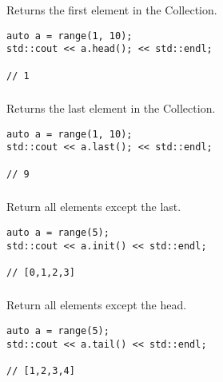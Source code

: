 Returns the first element in the Collection.

\begin{lstlisting}[title=example]
auto a = range(1, 10);
std::cout << a.head(); << std::endl;

// 1
\end{lstlisting}




\subsubsection{}

Returns the last element in the Collection.

\begin{lstlisting}[title=example]
auto a = range(1, 10);
std::cout << a.last(); << std::endl;

// 9
\end{lstlisting}




\subsubsection{}

Return all elements except the last.

\begin{lstlisting}[title=example]
auto a = range(5);
std::cout << a.init() << std::endl;

// [0,1,2,3]
\end{lstlisting}




\subsubsection{}

Return all elements except the head.

\begin{lstlisting}[title=example]
auto a = range(5);
std::cout << a.tail() << std::endl;

// [1,2,3,4]
\end{lstlisting}



\subsubsection{}

